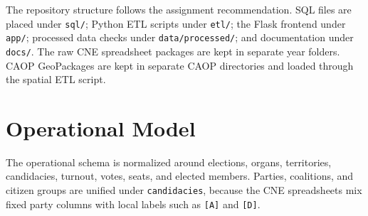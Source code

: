 \documentclass[11pt,twocolumn]{article}
\begin{document}
The repository structure follows the assignment recommendation. SQL files are placed under \texttt{sql/}; Python ETL scripts under \texttt{etl/}; the Flask frontend under \texttt{app/}; processed data checks under \texttt{data/processed/}; and documentation under \texttt{docs/}. The raw CNE spreadsheet packages are kept in separate year folders. CAOP GeoPackages are kept in separate CAOP directories and loaded through the spatial ETL script.

\section{Operational Model}

The operational schema is normalized around elections, organs, territories, candidacies, turnout, votes, seats, and elected members. Parties, coalitions, and citizen groups are unified under \texttt{candidacies}, because the CNE spreadsheets mix fixed party columns with local labels such as \texttt{[A]} and \texttt{[D]}.
\end{document}
